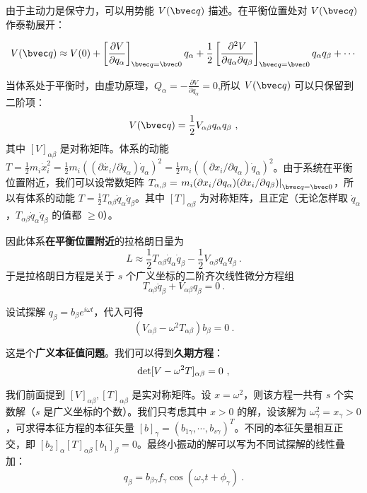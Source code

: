 由于主动力是保守力，可以用势能 $V(\bvec q)$ 描述。在平衡位置处对 $V(\bvec q)$ 作泰勒展开：

\begin{equation}
V(\bvec q)\approx V(0)+\left[\frac{\partial V}{\partial q_\alpha}\right]_{\bvec q=\bvec 0} q_\alpha+\frac{1}{2}\left[\frac{\partial^2V}{\partial q_\alpha\partial q_\beta}\right]_{\bvec q=\bvec 0} q_\alpha q_\beta+\cdots
\end{equation}

当体系处于平衡时，由虚功原理，$Q_\alpha=-\frac{\partial V}{\partial q_\alpha}=0$,所以 $V(\bvec q)$ 可以只保留到二阶项：
\begin{equation}
V(\bvec q)=\frac{1}{2}V_{\alpha\beta}q_\alpha q_\beta~,
\end{equation}
其中 $[V]_{\alpha\beta}$ 是对称矩阵。体系的动能 $T=\frac{1}{2}m_i\dot{x}_i^2=\frac{1}{2}m_i((\partial \dot{x_i} / \partial \dot{q}_\alpha) \dot{q}_\alpha)^2= \frac{1}{2}m_i((\partial x_i/\partial q_\alpha)\dot{q}_\alpha)^2$。由于系统在平衡位置附近，我们可以设常数矩阵 $T_{\alpha,\beta}=\left.m_i(\partial x_i/\partial q_\alpha)(\partial x_i/\partial q_\beta)\right|_{\bvec q=\bvec 0}$，所以有体系的动能 $T=\frac{1}{2}T_{\alpha\beta} \dot{q}_\alpha \dot{q}_\beta$。其中 $[T]_{\alpha\beta}$ 为对称矩阵，且正定（无论怎样取 $\dot{q}_\alpha$，$T_{\alpha\beta} \dot{q}_\alpha \dot{q}_\beta$ 的值都 $\ge0$）。

因此体系\textbf{在平衡位置附近}的拉格朗日量为
\begin{equation}
L\approx\frac{1}{2}T_{\alpha\beta}\dot{q}_\alpha \dot{q}_\beta-\frac{1}{2}V_{\alpha\beta}q_\alpha q_\beta~.
\end{equation}
于是拉格朗日方程是关于 $s$ 个广义坐标的二阶齐次线性微分方程组
\begin{equation}
T_{\alpha\beta}\ddot{q}_\beta+V_{\alpha\beta}q_\beta=0~.
\end{equation}

设试探解 $q_\beta=b_\beta e^{i\omega t}$，代入可得
\begin{equation}
(V_{\alpha\beta} - \omega^2 T_{\alpha\beta}) b_\beta = 0~.
\end{equation}

这是个\textbf{广义本征值问题}。我们可以得到\textbf{久期方程}：
\begin{equation}
{\rm{det}}[V-\omega^2 T]_{\alpha\beta}=0 ~,
\end{equation}

我们前面提到 $[V]_{\alpha\beta},[T]_{\alpha\beta}$ 是实对称矩阵。设 $x=\omega^2$，则该方程一共有 $s$ 个实数解（$s$ 是广义坐标的个数）。我们只考虑其中 $x>0$ 的解，设该解为 $\omega_\gamma^2=x_\gamma>0$，可求得本征方程的本征矢量 $[b]_\gamma=(b_{1\gamma},\cdots,b_{s\gamma})^T$。不同的本征矢量相互正交，即 $[b_2]_{\alpha}[T]_{\alpha\beta} [b_1]_{\beta}=0$。最终小振动的解可以写为不同试探解的线性叠加：
\begin{equation}
q_\beta = b_{\beta\gamma}f_\gamma \cos(\omega_\gamma t + \phi_\gamma)~.
\end{equation}

